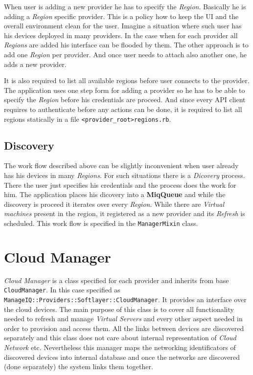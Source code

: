 When user is adding a new provider he has to specify the \emph{Region}. Basically he is adding a \emph{Region} specific provider. This is a policy how to keep the UI and the overall environment clean for the user. Imagine a situation where such user has his devices deployed in many providers. In the case when for each provider all \emph{Regions} are added his interface can be flooded by them. The other approach is to add one \emph{Region} per provider. And once user needs to attach also another one, he adds a new provider.

It is also required to list all available regions before user connects to the provider. The application uses one step form for adding a provider so he has to be able to specify the \emph{Region} before his credentials are proceed. And since every API client requires to authenticate before any actions can be done, it is required to list all regions statically in a file \verb|<provider_root>regions.rb|.

\subsection{Discovery}
\label{sub:Discovery}

The work flow described above can be slightly inconvenient when user already has his devices in many \emph{Regions}. For such situations there is a \emph{Dicovery} process. There the user just specifies his credentials and the process does the work for him. The application places his dicovery into a \textbf{MiqQueue} and while the discovery is proceed it iterates over every \emph{Region}. While there are \emph{Virtual machines} present in the region, it registered as a new provider and its \emph{Refresh} is scheduled. This work flow is specified in the \verb|ManagerMixin| class.

\clearpage
\section{Cloud Manager}
\label{sec:Cloud Manager}

\emph{Cloud Manager} is a class specified for each provider and inherits from base \verb|CloudManager|. In this case specified as \verb|ManageIQ::Providers::Softlayer::CloudManager|. It provides an interface over the cloud devices. The main purpose of this class is to cover all functionality needed to refresh and manage \emph{Virtual Servers} and every other aspect needed in order to provision and access them. All the links between devices are discovered separately and this class does not care about internal representation of \emph{Cloud Network} etc. Nevertheless this manager maps the networking identificators of discovered devices into internal database and once the networks are discovered (done separately) the system links them together.

